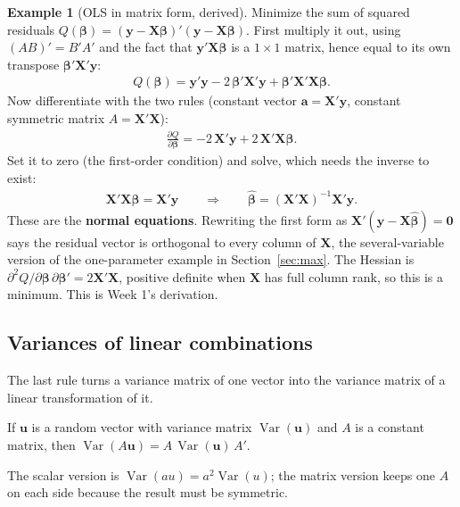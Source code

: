 \documentclass[11pt]{article}
\theoremstyle{definition}
\newtheorem{example}{Example}[section]
\DeclareMathOperator{\Var}{Var}
\newcommand{\X}{\bm{X}}
\newcommand{\Y}{\bm{y}}
\newcommand{\bbeta}{\bm{\beta}}
\newcommand{\bhat}{\hat{\bm{\beta}}}
\begin{document}
\begin{example}[OLS in matrix form, derived]
Minimize the sum of squared residuals $Q(\bbeta) = (\Y - \X\bbeta)'(\Y -
\X\bbeta)$. First multiply it out, using $(AB)' = B'A'$ and the fact that
$\Y'\X\bbeta$ is a $1 \times 1$ matrix, hence equal to its own transpose
$\bbeta'\X'\Y$:
\begin{align*}
  Q(\bbeta) = \Y'\Y - 2\,\bbeta'\X'\Y + \bbeta'\X'\X\bbeta .
\end{align*}
Now differentiate with the two rules (constant vector $\bm a = \X'\Y$,
constant symmetric matrix $A = \X'\X$):
\begin{align*}
  \frac{\partial Q}{\partial\bbeta} = -2\,\X'\Y + 2\,\X'\X\bbeta .
\end{align*}
Set it to zero (the first-order condition) and solve, which needs the
inverse to exist:
\begin{align*}
  \X'\X\bbeta = \X'\Y \qquad\Longrightarrow\qquad \bhat = (\X'\X)^{-1}\X'\Y .
\end{align*}
These are the \textbf{normal equations}. Rewriting the first form as
$\X'(\Y - \X\bhat) = \bm 0$ says the residual vector is orthogonal to every
column of $\X$, the several-variable version of the one-parameter example
in Section~\ref{sec:max}. The Hessian is $\partial^2 Q/\partial\bbeta\,\partial\bbeta'
= 2\X'\X$, positive definite when $\X$ has full column rank, so this is a
minimum. This is Week 1's derivation.
\end{example}

\subsection{Variances of linear combinations}
\label{sec:varlin}

The last rule turns a variance matrix of one vector into the variance matrix
of a linear transformation of it.

\begin{rulebox}[variance of $A\bm u$]
If $\bm u$ is a random vector with variance matrix $\Var(\bm u)$ and $A$
is a constant matrix, then $\Var(A\bm u) = A\,\Var(\bm u)\,A'$.
\end{rulebox}
The scalar version is $\Var(au) = a^2\Var(u)$; the matrix version keeps
one $A$ on each side because the result must be symmetric.
\end{document}

